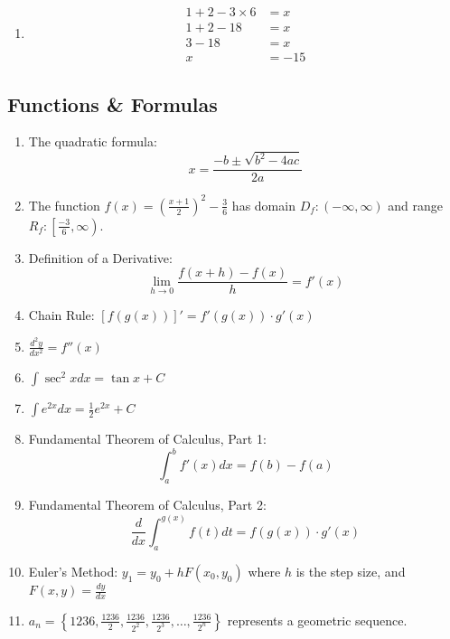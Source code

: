 \documentclass[12pt]{article}
\begin{document}
\begin{enumerate}
\begin{enumerate}
  \item 
        \begin{align}
        1 + 2 - 3 \times 6 &= x \tag{1}\\
        1 + 2 - 18 &= x \tag{2}\\
        3 - 18 &= x \tag{3}\\
        x &= -15 \tag{4}
        \end{align}
    \end{enumerate}
\end{enumerate}

\subsection{Functions \& Formulas}
\begin{enumerate}
    \item The quadratic formula:
    \[
    x = \frac{-b \pm \sqrt{b^2 - 4ac}}{2a}
    \]
    
    \item The function $f(x) = \left(\frac{x+1}{2}\right)^2 - \frac{3}{6}$ has domain $D_f: (-\infty, \infty)$ and range $R_f: \left[\frac{-3}{6}, \infty\right)$.
    
    \item Definition of a Derivative: 
    \[
    \lim_{h \to 0} \frac{f(x+h) - f(x)}{h} = f'(x)
    \]
    
    \item Chain Rule: $[f(g(x))]' = f'(g(x)) \cdot g'(x)$
    
    \item $\frac{d^2y}{dx^2} = f''(x)$
    
    \item $\int \sec^2 x dx = \tan x + C$
 \item $\int e^{2x} dx = \frac{1}{2}e^{2x} + C$
    
    \item Fundamental Theorem of Calculus, Part 1:
    \[
    \int_{a}^{b} f'(x) dx = f(b) - f(a)
    \]
    
    \item Fundamental Theorem of Calculus, Part 2:
    \[
    \frac{d}{dx} \int_{a}^{g(x)} f(t) dt = f(g(x)) \cdot g'(x)
    \]
    
    \item Euler's Method: $y_1 = y_0 + hF(x_0, y_0)$ where $h$ is the step size, and $F(x, y) = \frac{dy}{dx}$
    
    \item $a_n = \left\{1236, \frac{1236}{2}, \frac{1236}{2^2}, \frac{1236}{2^3}, \ldots, \frac{1236}{2^n}\right\}$ represents a geometric sequence.
    

\end{enumerate}
\end{document}
